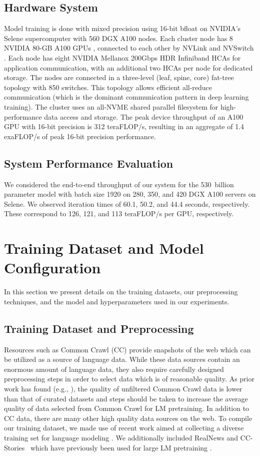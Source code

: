 \documentclass[11pt]{article}
\begin{document}
\subsection{Hardware System}
Model training is done with mixed precision using 16-bit bfloat on NVIDIA’s Selene \cite{selene}
supercomputer with 560 DGX A100 nodes. Each cluster node has 8 NVIDIA 80-GB A100
GPUs \cite{a100}, connected to each other by NVLink and NVSwitch \cite{nvlink}.
Each node has eight NVIDIA Mellanox 200Gbps HDR Infiniband HCAs for application
communication, with an additional two HCAs per node for dedicated storage. The
nodes are connected in a three-level (leaf, spine, core) fat-tree topology with
850 switches. This topology allows efficient all-reduce communication (which is the dominant
communication pattern in deep learning training). The cluster uses an all-NVME
shared parallel filesystem for high-performance data access and storage. The
peak device throughput of an A100 GPU with 16-bit precision is 312 teraFLOP/s,
resulting in an aggregate of 1.4 exaFLOP/s of peak 16-bit precision performance.


\subsection{System Performance Evaluation}
We considered the end-to-end throughput of our system for the 530~billion parameter model with batch size 1920 on 280, 350, and 420 DGX A100 servers on Selene. We observed iteration times of 60.1, 50.2, and 44.4 seconds, respectively. These correspond to 126, 121, and 113 teraFLOP/s per GPU, respectively.


\section{Training Dataset and Model Configuration}
\label{sec:datamodel}
In this section we present details on the training datasets, our preprocessing techniques, and the model and hyperparameters used in our experiments.

\subsection{Training Dataset and Preprocessing}
Resources such as Common Crawl (CC) provide snapshots of the web which can be utilized as a source of language data. While these data sources contain an enormous amount of language data, they also require carefully designed preprocessing steps in order to select data which is of reasonable quality. As prior work has found (e.g., \citep{brown2020language}), the quality of unfiltered Common Crawl data is lower than that of curated datasets and steps should be taken to increase the average quality of  data selected from Common Crawl for LM pretraining. In addition to CC data, there are many other high quality data sources on the web. To compile our training dataset, we made use of recent work aimed at collecting a diverse training set for language modeling \citep{pile-dataset-2020}. We additionally included RealNews \cite{DBLP:journals/corr/abs-1905-12616} and CC-Stories~\cite{trinh18} which have previously been used for large LM pretraining \cite{tnlg17b,megatron-DBLP:journals/corr/abs-1909-08053}.
\end{document}
